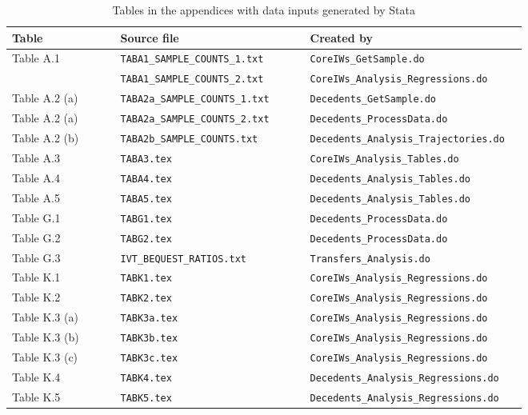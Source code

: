 \documentclass[a4,12p]{article}
\begin{document}
\begin{landscape}
\begin{table}[ht]
\caption{Tables in the appendices with data inputs generated by Stata \label{Tab:AppendixTables}}
\begin{tabular}{p{0.20\linewidth} p{0.35\linewidth} p{0.40\linewidth}}
\toprule
Table & Source file & Created by \\
\midrule
Table A.1 & {\tt TABA1\_SAMPLE\_COUNTS\_1.txt} & {\tt CoreIWs\_GetSample.do} \\
 & {\tt TABA1\_SAMPLE\_COUNTS\_2.txt} & {\tt CoreIWs\_Analysis\_Regressions.do} \\
\midrule
Table A.2 (a) & {\tt TABA2a\_SAMPLE\_COUNTS\_1.txt} & {\tt Decedents\_GetSample.do} \\
Table A.2 (a) & {\tt TABA2a\_SAMPLE\_COUNTS\_2.txt} & {\tt Decedents\_ProcessData.do} \\
Table A.2 (b) & {\tt TABA2b\_SAMPLE\_COUNTS.txt} & {\tt Decedents\_Analysis\_Trajectories.do} \\
\midrule
Table A.3 & {\tt TABA3.tex} & {\tt CoreIWs\_Analysis\_Tables.do}  \\
\midrule
Table A.4 & {\tt TABA4.tex} & {\tt Decedents\_Analysis\_Tables.do} \\
\midrule
Table A.5 & {\tt TABA5.tex} & {\tt Decedents\_Analysis\_Tables.do} \\
\midrule
Table G.1 & {\tt TABG1.tex} & {\tt Decedents\_ProcessData.do} \\
\midrule
Table G.2 & {\tt TABG2.tex} & {\tt Decedents\_ProcessData.do} \\
\midrule
Table G.3 & {\tt IVT\_BEQUEST\_RATIOS.txt} & {\tt Transfers\_Analysis.do} \\
\midrule
Table K.1 & {\tt TABK1.tex} & {\tt CoreIWs\_Analysis\_Regressions.do} \\
\midrule
Table K.2 & {\tt TABK2.tex} & {\tt CoreIWs\_Analysis\_Regressions.do} \\
\midrule
Table K.3 (a) & {\tt TABK3a.tex} & {\tt CoreIWs\_Analysis\_Regressions.do} \\
Table K.3 (b) & {\tt TABK3b.tex} & {\tt CoreIWs\_Analysis\_Regressions.do} \\
Table K.3 (c) & {\tt TABK3c.tex} & {\tt CoreIWs\_Analysis\_Regressions.do} \\
 \midrule
Table K.4 & {\tt TABK4.tex} & {\tt Decedents\_Analysis\_Regressions.do} \\
\midrule
Table K.5 & {\tt TABK5.tex} & {\tt Decedents\_Analysis\_Regressions.do} \\

\end{tabular}
\end{table}
\end{landscape}
\end{document}
